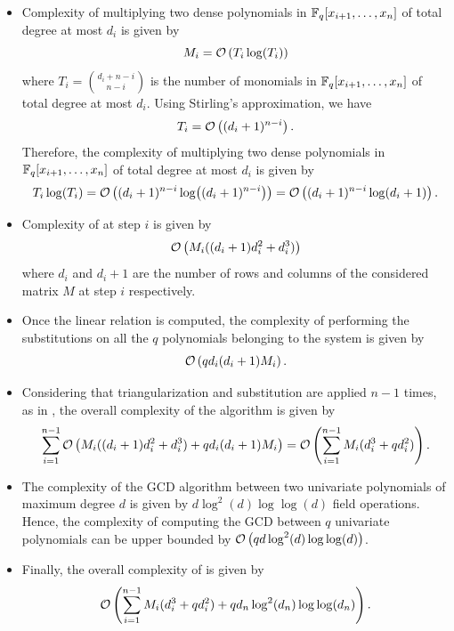 \begin{itemize}
    \item Complexity of multiplying two dense polynomials in \(\mathbb{F}_q[x_{i+1}, \dots, x_n]\) of total degree at most \(d_i\) is given by \[
     M_i = \mathcal{O}\left(T_i\log(T_i)\right)
    \] where \(T_i = \binom{d_i+n-i}{n-i}\) is the number of monomials in \(\mathbb{F}_q[x_{i+1}, \dots, x_n]\) of total degree at most \(d_i\).
     Using Stirling's approximation, we have
     \[
     T_i = \mathcal{O}\left( (d_i+1)^{n-i} \right).
     \]
     Therefore, the complexity of multiplying two dense polynomials in \(\mathbb{F}_q[x_{i+1}, \dots, x_n]\) of total degree at most \(d_i\) is given by
     \[
     T_i\log(T_i) = \mathcal{O}\left( (d_i+1)^{n-i}\log((d_i+1)^{n-i}) \right) = \mathcal{O}\left( (d_i+1)^{n-i}\log(d_i+1) \right).
     \]
     
    \item Complexity of  at step \(i\) is given by
    \[
    \mathcal{O}\left( M_i((d_i+1)d_i^2 + d_i^3) \right)
    \] where $d_i$ and $d_i+1$ are the number of rows and columns of the considered matrix \(M\) at step \(i\) respectively. 
    \item Once the linear relation is computed, the complexity of performing the substitutions on all the $q$ polynomials belonging to the system is given by
    \[
        \mathcal{O}\left( qd_i(d_i+1)M_i \right).
    \]
    \item Considering that triangularization and substitution are applied \(n-1\) times, as in , the overall complexity of the algorithm is given by 
    \[
        \mathop\sum_{i=1}^{n-1} \mathcal{O}\left( M_i((d_i+1)d_i^2 + d_i^3) + qd_i(d_i+1)M_i \right) = \mathcal{O}\left( \sum_{i=1}^{n-1} M_i(d_i^3 + qd_i^2) \right).
    \]

    \item The complexity of the GCD algorithm between two univariate polynomials of maximum degree \(d\) is given by \(d\log^2(d)\log\log(d)\) field operations. Hence, the complexity of computing the GCD between \(q\) univariate polynomials can be upper bounded by \(\mathcal{O}\left( qd\log^2(d)\log\log(d) \right)\).
    \item Finally, the overall complexity of  is given by \[
        \mathcal{O}\left( \sum_{i=1}^{n-1} M_i(d_i^3 + qd_i^2) + qd_n\log^2(d_n)\log\log(d_n) \right).
    \]
\end{itemize}

